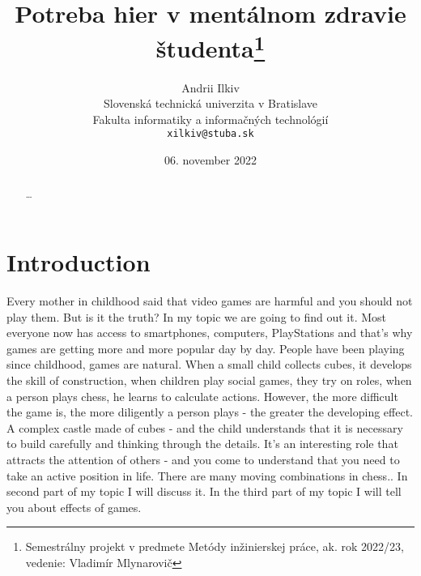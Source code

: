 \documentclass[10pt,twoside,slovak,a4paper]{article}
\title{Potreba hier v mentálnom zdravie študenta\thanks{Semestrálny projekt v predmete Metódy inžinierskej práce, ak. rok 2022/23, vedenie: Vladimír Mlynarovič}}
\author{Andrii Ilkiv\\[2pt]
	{\small Slovenská technická univerzita v Bratislave}\\
	{\small Fakulta informatiky a informačných technológií}\\
	{\small \texttt{xilkiv@stuba.sk}}
	}
\date{\small 06. november 2022}
\begin{document}
\maketitle
\begin{abstract}
\ldots
\end{abstract}
\section{Introduction}
Every mother in childhood said that video games are harmful and you should not play them. But is it the truth?  In my topic we are going to find out it. Most everyone now has access to smartphones, computers, PlayStations and that's why games are getting more and more popular day by day. People have been playing since childhood, games are natural. When a small child collects cubes, it develops the skill of construction, when children play social games, they try on roles, when a person plays chess, he learns to calculate actions. \newline However, the more difficult the game is, the more diligently a person plays - the greater the developing effect. A complex castle made of cubes - and the child understands that it is necessary to build carefully and thinking through the details. It's an interesting role that attracts the attention of others - and you come to understand that you need to take an active position in life. There are many moving combinations in chess.. In second part of my topic I will discuss it. In the third part of my topic I will tell you about effects of games.
\end{document}

